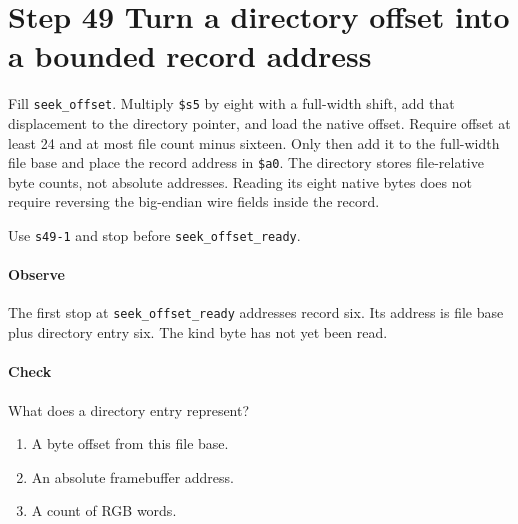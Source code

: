\section{Step 49 Turn a directory offset into a bounded record address}
Fill \texttt{seek\_offset}. Multiply \texttt{\$s5} by eight with a full-width shift, add that displacement to the directory pointer, and load the native offset. Require offset at least 24 and at most file count minus sixteen. Only then add it to the full-width file base and place the record address in \texttt{\$a0}. The directory stores file-relative byte counts, not absolute addresses. Reading its eight native bytes does not require reversing the big-endian wire fields inside the record.

Use \texttt{s49-1} and stop before \texttt{seek\_offset\_ready}.

\paragraph{Observe} The first stop at \texttt{seek\_offset\_ready} addresses record six. Its address is file base plus directory entry six. The kind byte has not yet been read.

\paragraph{Check} What does a directory entry represent?
\begin{enumerate}[label=\Alph*.]
\item A byte offset from this file base.
\item An absolute framebuffer address.
\item A count of RGB words.
\end{enumerate}
